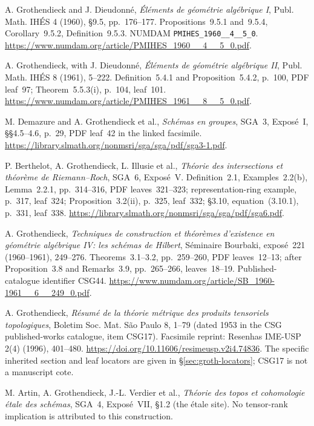 A. Grothendieck and J. Dieudonn\'e,
\emph{\'El\'ements de g\'eom\'etrie alg\'ebrique I},
Publ. Math. IH\'ES 4 (1960), \S9.5, pp.~176--177.
Propositions~9.5.1 and~9.5.4, Corollary~9.5.2, Definition~9.5.3.
NUMDAM \texttt{PMIHES\_1960\_\_4\_\_5\_0}.
\url{https://www.numdam.org/article/PMIHES_1960__4__5_0.pdf}.

A. Grothendieck, with J. Dieudonn\'e,
\emph{\'El\'ements de g\'eom\'etrie alg\'ebrique II},
Publ. Math. IH\'ES 8 (1961), 5--222.
Definition~5.4.1 and Proposition~5.4.2, p.~100,
PDF leaf~97; Theorem~5.5.3(i), p.~104, leaf~101.
\url{https://www.numdam.org/article/PMIHES_1961__8__5_0.pdf}.

M. Demazure and A. Grothendieck et al.,
\emph{Sch\'emas en groupes}, SGA~3,
Expos\'e~I, \S\S4.5--4.6, p.~29,
PDF leaf~42 in the linked facsimile.
\url{https://library.slmath.org/nonmsri/sga/sga/pdf/sga3-1.pdf}.

P. Berthelot, A. Grothendieck, L. Illusie et al.,
\emph{Th\'eorie des intersections et th\'eor\`eme de Riemann--Roch},
SGA~6, Expos\'e~V. Definition~2.1, Examples~2.2(b),
Lemma~2.2.1, pp.~314--316, PDF leaves~321--323;
representation-ring example, p.~317, leaf~324;
Proposition~3.2(ii), p.~325, leaf~332;
\S3.10, equation~(3.10.1), p.~331, leaf~338.
\url{https://library.slmath.org/nonmsri/sga/sga/pdf/sga6.pdf}.

A. Grothendieck,
\emph{Techniques de construction et th\'eor\`emes d'existence
en g\'eom\'etrie alg\'ebrique IV: les sch\'emas de Hilbert},
S\'eminaire Bourbaki, expos\'e~221 (1960--1961), 249--276.
Theorems~3.1--3.2, pp.~259--260, PDF leaves~12--13;
after Proposition~3.8 and Remarks~3.9, pp.~265--266,
leaves~18--19. Published-catalogue identifier CSG44.
\url{https://www.numdam.org/article/SB_1960-1961__6__249_0.pdf}.

A. Grothendieck,
\emph{R\'esum\'e de la th\'eorie m\'etrique des produits tensoriels topologiques},
Boletim Soc. Mat. S\~ao Paulo 8, 1--79 (dated 1953
in the CSG published-works catalogue, item CSG17).
Facsimile reprint: Resenhas IME-USP 2(4) (1996), 401--480.
\url{https://doi.org/10.11606/resimeusp.v2i4.74836}.
The specific inherited section and leaf locators are given in
\S\ref{sec:groth-locators}; CSG17 is not a manuscript cote.

M. Artin, A. Grothendieck, J.-L. Verdier et al.,
\emph{Th\'eorie des topos et cohomologie \'etale des sch\'emas},
SGA~4, Expos\'e~VII, \S1.2 (the \'etale site).
No tensor-rank implication is attributed to this construction.

